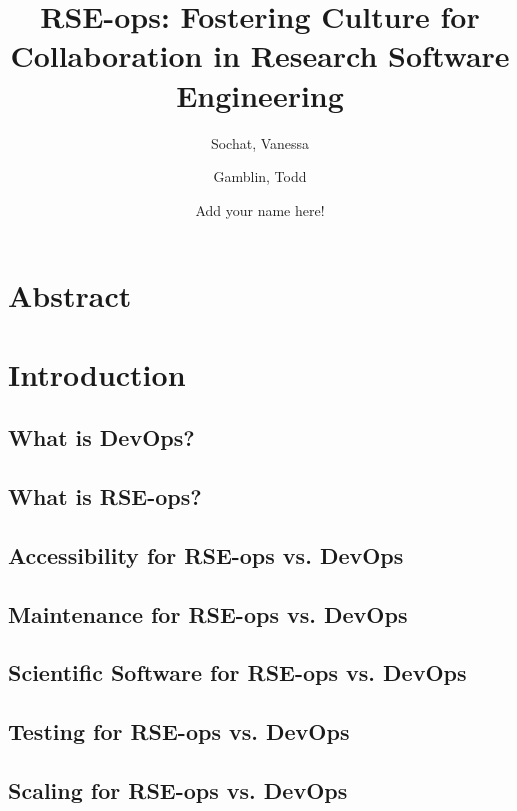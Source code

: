 \documentclass{article}
\title{RSE-ops: Fostering Culture for Collaboration in Research Software Engineering}
\author{
  Sochat, Vanessa\\
  \and
  Gamblin, Todd\\
  \and
  Add your name here!
}
\begin{document}
\maketitle

\section{Abstract}


\section{Introduction}


\subsection{What is DevOps?}

\subsection{What is RSE-ops?}




\subsection{Accessibility for RSE-ops vs. DevOps}


\subsection{Maintenance for RSE-ops vs. DevOps}


\subsection{Scientific Software for RSE-ops vs. DevOps}


\subsection{Testing for RSE-ops vs. DevOps}


\subsection{Scaling for RSE-ops vs. DevOps}

\end{document}
